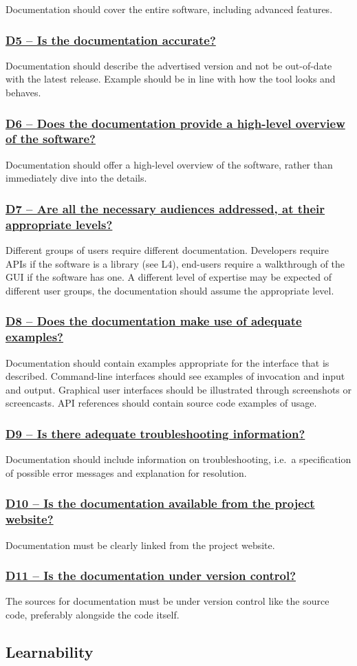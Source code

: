 \documentclass[a4paper,11pt]{article}
\newcommand{\indicator}[1]{\subsubsection*{\underline{#1}}}
\begin{document}
Documentation should cover the entire software, including advanced features.

\indicator{D5 -- Is the documentation accurate?}

Documentation should describe the advertised version and not be out-of-date
with the latest release. Example should be in line with how the tool looks and
behaves.

\indicator{D6 -- Does the documentation provide a high-level overview of the software?}

Documentation should offer a high-level overview of the software, rather
than immediately dive into the details.

\indicator{D7 -- Are all the necessary audiences addressed, at their appropriate levels?}

Different groups of users require different documentation. Developers require
APIs if the software is a library (see L4), end-users require a walkthrough of the GUI
if the software has one. A different level of expertise may be expected of
different user groups, the documentation should assume the appropriate level.

\indicator{D8 -- Does the documentation make use of adequate examples?}

Documentation should contain examples appropriate for the interface that is
described. Command-line interfaces should see examples of invocation and input
and output. Graphical user interfaces should be illustrated through screenshots or
screencasts. API references should contain source code examples of usage.

\indicator{D9 -- Is there adequate troubleshooting information?}

Documentation should include information on troubleshooting, i.e.\ a
specification of possible error messages and explanation for resolution.

\indicator{D10 -- Is the documentation available from the project website?}

Documentation must be clearly linked from the project website.

\indicator{D11 -- Is the documentation under version control?}

The sources for documentation must be under version control like the source
code, preferably alongside the code itself.

\subsection{Learnability}
\end{document}
